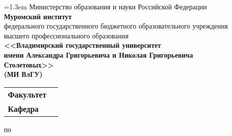 \newlength{\frontpagefk} %
\setlength{\frontpagefk}{6cm}
\newlength{\frontpagerb} %
\setlength{\frontpagerb}{6cm}
\newlength{\frontpagerbspace} %
\setlength{\frontpagerbspace}{1cm}
\newlength{\FrontPageSubjSpace} %
\setlength{\FrontPageSubjSpace}{1cm}
\newlength{\FrontPageTopicSpace} %
\setlength{\FrontPageTopicSpace}{0.5cm}

\thispagestyle{empty}
\begin{center}
{
\vspace*{-1.5cm}
\baselineskip=1.3em
{\small Министерство образования и науки Российской Федерации}\\
\textbf{Муромский институт}\\
{\footnotesize федерального государственного бюджетного образовательного учреждения\\
высшего профессионального образования}\\
\textbf{<<Владимирский государственный университет\\
имени Александра Григорьевича и Николая Григорьевича\\
Столетовых>>\\
(МИ ВлГУ)\\}
}

\bigskip
\begin{tabular}{l c}
\textbf{Факультет}&\underline{\makebox[\frontpagefk]{\FrontPageDepartment}}\\
\textbf{Кафедра}&\underline{\makebox[\frontpagefk]{\FrontPageSubdepartment}}\\
\end{tabular}

\vspace{\fill}
\begin{Huge}
\textbf{\textsl{\WorkType}}
\end{Huge}

\vspace{\fill}
по \underline{\makebox[\FrontPageSubjSpace]{}\Subject\makebox[\FrontPageSubjSpace]{}}

\smallskip
\parbox{15cm}{}

\vspace{\fill}

\begin{flushright}


\end{flushright}
\end{center}
